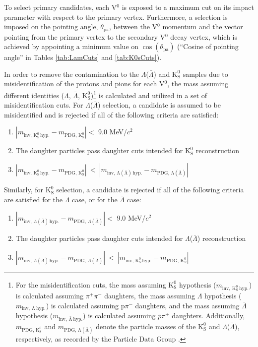 \documentclass[ALICE,manyauthors]{cernphprep}
\newcommand{\Lam}{$\Lambda$\xspace}
\newcommand{\ALam}{$\bar{\Lambda}$\xspace}
\newcommand{\LamALam}{$\Lambda$($\bar{\Lambda}$)\xspace}
\newcommand{\Ks}{$\mathrm{K^{0}_{S}}$\xspace}
\newcommand{\Vz}{V$^{0}$\xspace}
\begin{document}
To select primary candidates, each \Vz is exposed to a maximum cut on its impact parameter with respect to the primary vertex.
Furthermore, a selection is imposed on the pointing angle, $\theta_{\mathrm{pa}}$, between the \Vz momentum and the vector pointing from the primary vertex to the secondary \Vz decay vertex, which is achieved by appointing a minimum value on $\cos(\theta_{\mathrm{pa}})$ (``Cosine of pointing angle'' in Tables \ref{tab:LamCuts} and \ref{tab:K0sCuts}).

In order to remove the contamination to the \LamALam and \Ks samples due to misidentification of the protons and pions for each \Vz, the mass assuming different identities (\Lam, \ALam, \Ks)\footnote[1]
{
For the misidentification cuts, the mass assuming \Ks hypothesis ($m_{\mathrm{inv,~ K^{0}_{S}~ hyp.}}$) is calculated assuming $\pi^{+}\pi^{-}$ daughters, the mass assuming \Lam hypothesis ($m_{\mathrm{inv,~ \Lambda~ hyp.}}$) is calculated assuming p$\pi^{-}$ daughters, and the mass assuming \ALam hypothesis ($m_{\mathrm{inv,~ \bar{\Lambda}~ hyp.}}$) is calculated assuming $\bar{p}\pi^{+}$ daughters. 
Additionally, $m_{\mathrm{PDG,\,K^{0}_{S}}}$ and $m_{\mathrm{PDG,\,\Lambda(\bar{\Lambda})}}$ denote the particle masses of the \Ks and \LamALam, respectively, as recorded by the Particle Data Group \cite{Patrignani:2016xqp}.
}
is calculated and utilized in a set of misidentification cuts.
For \LamALam selection, a candidate is assumed to be misidentified and is rejected if all of the following criteria are satisfied:

\begin{enumerate}
 \item $\left|m_{\mathrm{inv,\,K^{0}_{S}\,hyp.}} - m_{\mathrm{PDG,\,K^{0}_{S}}}\right| < $ 9.0 MeV/$c^{2}$
 \item The daughter particles pass daughter cuts intended for \Ks reconstruction
 \item $\left|m_{\mathrm{inv,\,K^{0}_{S}\,hyp.}} - m_{\mathrm{PDG,\,K^{0}_{S}}}\right|~ < ~\left|m_{\mathrm{inv,\,\Lambda(\bar{\Lambda})\,hyp.}} - m_{\mathrm{PDG,\,\Lambda(\bar{\Lambda})}}\right|$
\end{enumerate} 
Similarly, for \Ks selection, a candidate is rejected if all of the following criteria are satisfied for the \Lam case, or for the \ALam case:
\begin{enumerate}
 \item $\left|m_{\mathrm{inv},\,\Lambda(\bar{\Lambda})\,\mathrm{hyp.}} - m_{\mathrm{PDG},\,\Lambda(\bar{\Lambda})}\right| < $ 9.0 MeV/$c^{2}$
 \item The daughter particles pass daughter cuts intended for \LamALam reconstruction
 \item $\left|m_{\mathrm{inv},\,\Lambda(\bar{\Lambda})\,\mathrm{hyp.}} - m_{\mathrm{PDG},\,\Lambda(\bar{\Lambda})}\right|~ < ~\left|m_{\mathrm{inv},\,\mathrm{K}^{0}_{S}\,\mathrm{hyp.}} - m_{\mathrm{PDG},\,\mathrm{K}^{0}_{S}}\right|$
\end{enumerate} 
\end{document}
